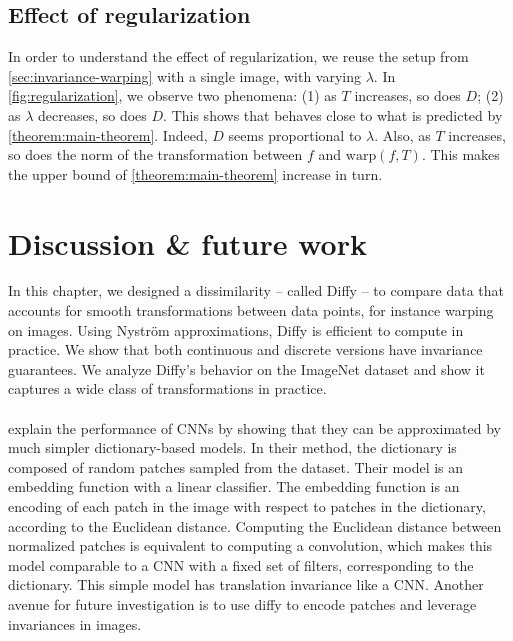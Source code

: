 \subsection{Effect of regularization}\label{sec:regularization}
In order to understand the effect of regularization, we reuse the setup from \cref{sec:invariance-warping} with a single image, with varying $\lambda$. In \cref{fig:regularization}, we observe two phenomena: (1) as $T$ increases, so does $D$; (2) as $\lambda$ decreases, so does $D$. This shows that \Diffy behaves close to what is predicted by \cref{theorem:main-theorem}. Indeed, $D$ seems proportional to $\lambda$. Also, as $T$ increases, so does the norm of the transformation between $f$ and $\text{warp}(f, T)$. This makes the upper bound of \cref{theorem:main-theorem} increase in turn.

\section{Discussion \& future work}

In this chapter, we designed a dissimilarity -- called Diffy -- to compare data that accounts for smooth transformations between data points, for instance warping on images. Using Nyström approximations, Diffy is efficient to compute in practice. We show that both continuous and discrete versions have invariance guarantees. We analyze Diffy's behavior on the ImageNet dataset and show it captures a wide class of transformations in practice.

\paragraph{}
\cite{thiry} explain the performance of CNNs by showing that they can be approximated by much simpler dictionary-based models. In their method, the dictionary is composed of random patches sampled from the dataset. Their model is an embedding function with a linear classifier. The embedding function is an encoding of each patch in the image with respect to patches in the dictionary, according to the Euclidean distance. Computing the Euclidean distance between normalized patches is equivalent to computing a convolution, which makes this model comparable to a CNN with a fixed set of filters, corresponding to the dictionary. This simple model has translation invariance like a CNN. Another avenue for future investigation is to use diffy to encode patches and leverage invariances in images.
